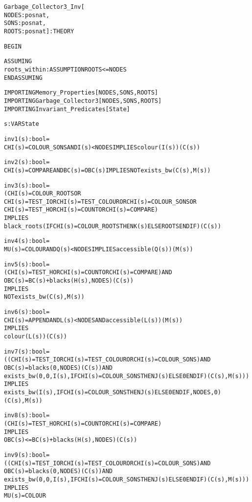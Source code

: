 \newpage
\begin{alltt}
%%%%%%%%%%%%%%%%%%%%%%%%%%%%%%%%%%%%%%%%%%%%%%%%%%%%%%%%%%%%%%%%%%
% Garbage_Collector3_Inv :                                       %
%   Defines all invariants used in proving the third refinement. %
%%%%%%%%%%%%%%%%%%%%%%%%%%%%%%%%%%%%%%%%%%%%%%%%%%%%%%%%%%%%%%%%%%

Garbage_Collector3_Inv[
  NODES : posnat, 
  SONS  : posnat, 
  ROOTS : posnat] : THEORY

BEGIN

  ASSUMING
    roots_within : ASSUMPTION ROOTS <= NODES
  ENDASSUMING

  IMPORTING Memory_Properties[NODES,SONS,ROOTS]
  IMPORTING Garbage_Collector3[NODES,SONS,ROOTS]
  IMPORTING Invariant_Predicates[State]

  s : VAR State

  inv1(s):bool =
    CHI(s)=COLOUR_SONS AND I(s) < NODES IMPLIES colour(I(s))(C(s))

  inv2(s):bool =
    CHI(s)=COMPARE AND BC(s)=OBC(s) IMPLIES NOT exists_bw(C(s),M(s))

  inv3(s):bool =
    (CHI(s)=COLOUR_ROOTS OR 
     CHI(s)=TEST_I OR CHI(s)=TEST_COLOUR OR CHI(s)=COLOUR_SONS OR
     CHI(s)=TEST_H OR CHI(s)=COUNT OR CHI(s)=COMPARE)
       IMPLIES
     black_roots(IF CHI(s)=COLOUR_ROOTS THEN K(s) ELSE ROOTS ENDIF)(C(s))

  inv4(s):bool =
    MU(s)=COLOUR AND Q(s) < NODES IMPLIES accessible(Q(s))(M(s))

  inv5(s):bool =
    (CHI(s)=TEST_H OR CHI(s)=COUNT OR CHI(s)=COMPARE) AND
    OBC(s) = BC(s) + blacks(H(s),NODES)(C(s))
      IMPLIES
    NOT exists_bw(C(s),M(s))

  inv6(s):bool =
    CHI(s)=APPEND AND L(s) < NODES AND accessible(L(s))(M(s))
      IMPLIES
    colour(L(s))(C(s))

  inv7(s):bool =
    ((CHI(s)=TEST_I OR CHI(s)=TEST_COLOUR OR CHI(s)=COLOUR_SONS) AND
      OBC(s) = blacks(0,NODES)(C(s)) AND
      exists_bw(0,0,I(s),IF CHI(s)=COLOUR_SONS THEN J(s) ELSE 0 ENDIF)(C(s),M(s)))
    IMPLIES
      exists_bw(I(s),IF CHI(s)=COLOUR_SONS THEN J(s) ELSE 0 ENDIF,NODES,0)
        (C(s),M(s))

  inv8(s):bool =
    (CHI(s)=TEST_H OR CHI(s)=COUNT OR CHI(s)=COMPARE)
      IMPLIES
    OBC(s) <= BC(s) + blacks(H(s),NODES)(C(s))

  inv9(s):bool =
    ((CHI(s)=TEST_I OR CHI(s)=TEST_COLOUR OR CHI(s)=COLOUR_SONS) AND
      OBC(s) = blacks(0,NODES)(C(s)) AND
      exists_bw(0,0,I(s),IF CHI(s)=COLOUR_SONS THEN J(s) ELSE 0 ENDIF)(C(s),M(s)))
    IMPLIES
      MU(s)=COLOUR


\end{alltt}
